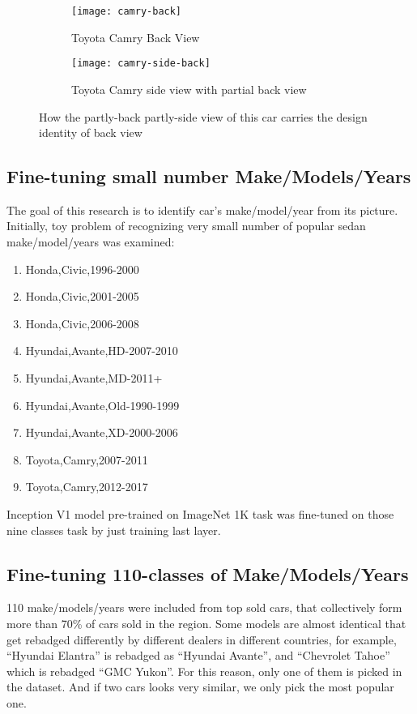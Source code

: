 \begin{figure}[!htbp]
\centering
    \begin{subfigure}[t]{0.48\textwidth}
        \centering
        \texttt{[image: camry-back]}
        \caption{Toyota Camry Back View}
    \end{subfigure}
    \begin{subfigure}[t]{0.48\textwidth}
        \centering
        \texttt{[image: camry-side-back]}
        \caption{Toyota Camry side view with partial back view}
    \end{subfigure}
\caption{How the partly-back partly-side view of this car carries the design identity of back view}\label{fig:back-side}
\end{figure}

\subsection{Fine-tuning small number Make/Models/Years}

The goal of this research is to identify car's make/model/year from its picture.
Initially, toy problem of recognizing very small number of popular sedan make/model/years was examined:

\begin{enumerate}
\item Honda,Civic,1996-2000
\item Honda,Civic,2001-2005
\item Honda,Civic,2006-2008
\item Hyundai,Avante,HD-2007-2010
\item Hyundai,Avante,MD-2011+
\item Hyundai,Avante,Old-1990-1999
\item Hyundai,Avante,XD-2000-2006
\item Toyota,Camry,2007-2011
\item Toyota,Camry,2012-2017
\end{enumerate}

Inception V1 model pre-trained on ImageNet 1K task was fine-tuned on those nine classes task by just training last layer.

\subsection{Fine-tuning 110-classes of Make/Models/Years}

110 make/models/years were included from top sold cars,
that collectively form more than 70\% of cars sold in the region.
Some models are almost identical that get rebadged differently by different dealers in different countries, 
for example, ``Hyundai Elantra'' is rebadged as ``Hyundai Avante'', and ``Chevrolet Tahoe'' which is rebadged ``GMC Yukon''.
For this reason, only one of them is picked in the dataset.
And if two cars looks very similar, we only pick the most popular one.

